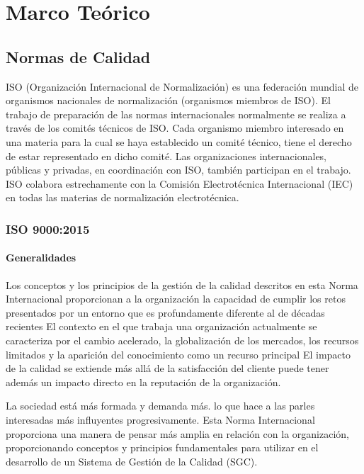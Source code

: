 \thispagestyle{plain}

\chapter{Marco Teórico}
	\section{Normas de Calidad}
			ISO (Organización Internacional de Normalización) es una federación mundial de organismos
			nacionales de normalización (organismos miembros de ISO). El trabajo de preparación de las normas
			internacionales normalmente se realiza a través de los comités técnicos de ISO. Cada organismo
			miembro interesado en una materia para la cual se haya establecido un comité técnico, tiene el derecho
			de estar representado en dicho comité. Las organizaciones internacionales, públicas y privadas, en
			coordinación con ISO, también participan en el trabajo. ISO colabora estrechamente con la Comisión
			Electrotécnica Internacional (IEC) en todas las materias de normalización electrotécnica.
		\subsection{ISO 9000:2015}
			\subsubsection{Generalidades}
				\par
					Los conceptos y los principios de la gestión de la calidad descritos en esta Norma Internacional
					proporcionan a la organización la capacidad de cumplir los retos presentados por un entorno que es
					profundamente diferente al de décadas recientes El contexto en el que trabaja una organización
					actualmente se caracteriza por el cambio acelerado, la globalización de los mercados, los recursos
					limitados y la aparición del conocimiento como un recurso principal El impacto de la calidad se extiende
					más allá de la satisfacción del cliente puede tener además un impacto directo en la reputación de la
					organización.
					
				\newpage
				\thispagestyle{plain}
				
				\par 
					\noindent La sociedad está más formada y demanda más. lo que hace a las parles interesadas más influyentes
					progresivamente. Esta Norma Internacional proporciona una manera de pensar más amplia en relación
					con la organización, proporcionando conceptos y principios fundamentales para utilizar en el desarrollo
					de un Sistema de Gestión de la Calidad (SGC).
					
